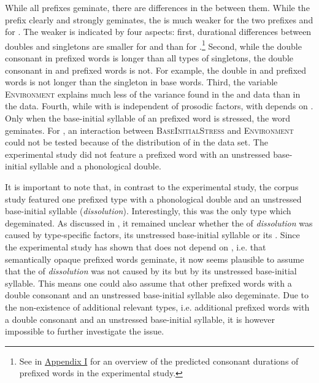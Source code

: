 While all prefixes geminate, there are differences in the  between them. While the prefix  clearly and strongly geminates, the  is much weaker for the two prefixes and for . The weaker  is indicated by four aspects: first, durational differences between doubles and singletons are smaller for  and  than for .\footnote{See  in \hyperref[Appendix I: Predicted Durations Experiment]{Appendix I} for an overview of the predicted consonant durations of prefixed words in the experimental study.} Second, while the double consonant in prefixed words is longer than all types of singletons, the double consonant in  and prefixed words is not. For example, the double in  and prefixed words is not longer than the singleton in base words. Third, the variable \textsc{Environment} explains much less of the variance found in the  and data than in the data. 
Fourth, while  with  is independent of prosodic factors,  with  depends on . Only when the base-initial syllable of an prefixed word is stressed, the word geminates. For , an interaction between \textsc{BaseInitialStress} and \textsc{Environment} could not be tested because of the distribution of  in the data set. The experimental study did not feature a prefixed word with an unstressed base-initial syllable and a phonological double.

It is important to note that, in contrast to the experimental study, the corpus study featured one prefixed type with a phonological double and an unstressed base-initial syllable (\textit{dissolution}). Interestingly, this was the only type which degeminated. As discussed in , it remained unclear whether the  of \textit{dissolution} was caused by type-specific factors, its unstressed base-initial syllable or its .
Since the experimental study has shown that  does not depend on , i.e. that semantically opaque prefixed words geminate,  it now seems plausible to assume that the  of \textit{dissolution} was not  caused by its  but by its unstressed base-initial syllable. This means one could also assume that other prefixed words with a double consonant and an unstressed base-initial syllable also degeminate. Due to the non-existence of additional relevant types, i.e. additional prefixed words with a double consonant and an unstressed base-initial syllable, it is however impossible to further investigate the issue. 





